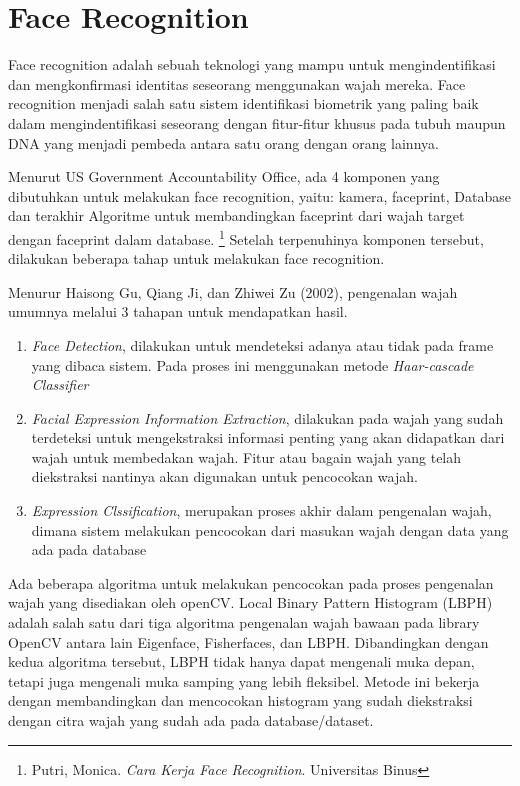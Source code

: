 \section{Face Recognition}
Face recognition adalah sebuah teknologi yang mampu untuk mengindentifikasi dan mengkonfirmasi identitas seseorang menggunakan wajah mereka. 
Face recognition menjadi salah satu sistem identifikasi biometrik yang paling baik dalam mengindentifikasi seseorang dengan fitur-fitur khusus pada tubuh maupun DNA yang menjadi pembeda antara satu orang dengan orang lainnya. 

Menurut US Government Accountability Office, ada 4 komponen yang dibutuhkan untuk melakukan face recognition, yaitu: kamera, faceprint, Database dan terakhir Algoritme untuk membandingkan faceprint dari wajah target dengan faceprint dalam database.
\footnote{Putri, Monica. \emph{Cara Kerja Face Recognition}. Universitas Binus}
Setelah terpenuhinya komponen tersebut, dilakukan beberapa tahap untuk melakukan face recognition.

Menurur Haisong Gu, Qiang Ji, dan Zhiwei Zu (2002), pengenalan wajah umumnya melalui 3 tahapan untuk mendapatkan hasil.
\begin{enumerate}[1.]
    \item \emph{Face Detection}, dilakukan untuk mendeteksi adanya atau tidak pada frame yang dibaca sistem. Pada proses ini menggunakan metode \emph{Haar-cascade Classifier}
    \item \emph{Facial Expression Information Extraction}, dilakukan pada wajah yang sudah terdeteksi untuk mengekstraksi informasi penting yang akan didapatkan dari wajah 
    untuk membedakan wajah. Fitur atau bagain wajah yang telah diekstraksi nantinya akan digunakan untuk pencocokan wajah.
    \item \emph{Expression Clssification}, merupakan proses akhir dalam pengenalan wajah, dimana sistem melakukan pencocokan dari masukan wajah dengan data yang ada pada database
  \end{enumerate}

Ada beberapa algoritma untuk melakukan pencocokan pada proses pengenalan wajah yang disediakan oleh openCV. Local Binary Pattern Histogram (LBPH) adalah salah satu dari tiga algoritma pengenalan wajah bawaan pada library OpenCV antara lain Eigenface,
Fisherfaces, dan LBPH. Dibandingkan dengan kedua algoritma tersebut, LBPH tidak hanya dapat mengenali muka depan, tetapi juga mengenali muka samping yang lebih fleksibel. Metode ini bekerja dengan membandingkan dan mencocokan histogram yang sudah 
diekstraksi dengan citra wajah yang sudah ada pada database/dataset.
